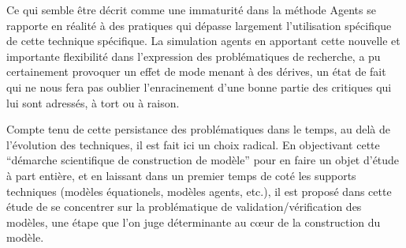


Ce qui semble être décrit comme une immaturité dans la méthode Agents \autocite{Heath2009} se rapporte en réalité à des pratiques qui dépasse largement l'utilisation spécifique de cette technique spécifique. La simulation agents en apportant cette nouvelle et importante flexibilité dans l'expression des problématiques de recherche, a pu certainement provoquer un effet de mode menant à des dérives, un état de fait qui ne nous fera pas oublier l'enracinement d'une bonne partie des critiques qui lui sont adressés, à tort ou à raison.

Compte tenu de cette persistance des problématiques dans le temps, au delà de l'évolution des techniques, il est fait ici un choix radical. En objectivant cette \enquote{démarche scientifique de construction de modèle} pour en faire un objet d'étude à part entière, et en laissant dans un premier temps de coté les supports techniques (modèles équationels, modèles agents, etc.), il est proposé dans cette étude de se concentrer sur la problématique de validation/vérification des modèles, une étape que l'on juge déterminante au cœur de la construction du modèle. 


